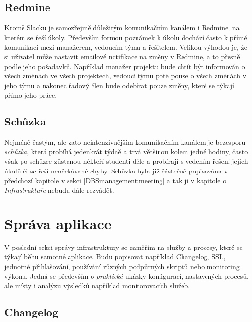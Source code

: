 \subsection{Redmine}

Kromě Slacku je samozřejmě důležitým komunikačním kanálem i Redmine, na kterém se řeší úkoly. Především formou poznámek k úkolu dochází často k přímé komunikaci mezi manažerem, vedoucím týmu a řešitelem. Velikou výhodou je, že si uživatel může nastavit emailové notifikace na změny v Redmine, a to přesně podle jeho požadavků. Například manažer projektu bude chtít být informován o všech změnách ve všech projektech, vedoucí týmu poté pouze o všech změnách v jeho týmu a nakonec řadový člen bude odebírat pouze změny, které se týkají přímo jeho práce.

\subsection{Schůzka}

Nejméně častým, ale zato neintenzivnějším komunikačním kanálem je bezesporu \emph{schůzka}, která probíhá jedenkrát týdně a trvá většinou kolem jedné hodiny, často však po schůzce zůstanou někteří studenti déle a probírají s vedením řešení jejich úkolů či se řeší neočekávané chyby. Schůzka byla již částečně popisována v předchozí kapitole v sekci \ref{DBSmanagement:meeting} a tak ji v kapitole o \emph{Infrastruktuře} nebudu dále rozvádět.


\section{Správa aplikace}

V poslední sekci správy infrastruktury se zaměřím na služby a procesy, které se týkají běhu samotné aplikace. Budu popisovat například Changelog, SSL, jednotné přihlašování, používání různých podpůrných skriptů nebo monitoring výkonu. Jedná se především o \emph{praktické} ukázky konfigurací, nastavených procesů, ale místy i analýzu výsledků například monitorovacích služeb.

\subsection{Changelog}

